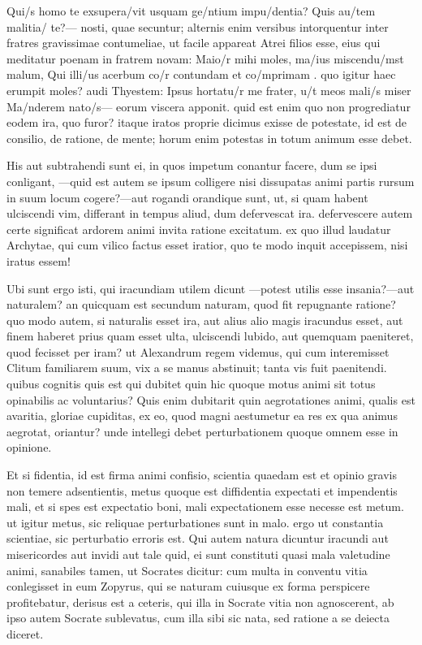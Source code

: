  Qui/s homo te exsupera/vit usquam ge/ntium impu/dentia? Quis au/tem malitia/ te?— nosti, quae secuntur; alternis enim versibus intorquentur inter fratres gravissimae contumeliae, ut facile appareat Atrei filios esse, eius qui meditatur poenam in fratrem novam: Maio/r mihi moles, ma/ius miscendu/mst malum, Qui illi/us acerbum co/r contundam et co/mprimam . quo igitur haec erumpit moles? audi Thyestem: Ipsus hortatu/r me frater, u/t meos mali/s miser Ma/nderem nato/s— eorum viscera apponit. quid est enim quo non progrediatur eodem ira, quo furor? itaque iratos proprie dicimus exisse de potestate, id est de consilio, de ratione, de mente; horum enim potestas in totum animum esse debet.

 His aut subtrahendi sunt ei, in quos impetum conantur facere, dum se ipsi conligant, —quid est autem se ipsum colligere nisi dissupatas animi partis rursum in suum locum cogere?—aut rogandi orandique sunt, ut, si quam habent ulciscendi vim, differant in tempus aliud, dum defervescat ira. defervescere autem certe significat ardorem animi invita ratione excitatum. ex quo illud laudatur Archytae, qui cum vilico factus esset iratior, quo te modo inquit accepissem, nisi iratus essem!

 Ubi sunt ergo isti, qui iracundiam utilem dicunt —potest utilis esse insania?—aut naturalem? an quicquam est secundum naturam, quod fit repugnante ratione? quo modo autem, si naturalis esset ira, aut alius alio magis iracundus esset, aut finem haberet prius quam esset ulta, ulciscendi lubido, aut quemquam paeniteret, quod fecisset per iram? ut Alexandrum regem videmus, qui cum interemisset Clitum familiarem suum, vix a se manus abstinuit; tanta vis fuit paenitendi. quibus cognitis quis est qui dubitet quin hic quoque motus animi sit totus opinabilis ac voluntarius? Quis enim dubitarit quin aegrotationes animi, qualis est avaritia, gloriae cupiditas, ex eo, quod magni aestumetur ea res ex qua animus aegrotat, oriantur? unde intellegi debet perturbationem quoque omnem esse in opinione.

 Et si fidentia, id est firma animi confisio, scientia quaedam est et opinio gravis non temere adsentientis, metus quoque est diffidentia expectati et impendentis mali, et si spes est expectatio boni, mali expectationem esse necesse est metum. ut igitur metus, sic reliquae perturbationes sunt in malo. ergo ut constantia scientiae, sic perturbatio erroris est. Qui autem natura dicuntur iracundi aut misericordes aut invidi aut tale quid, ei sunt constituti quasi mala valetudine animi, sanabiles tamen, ut Socrates dicitur: cum multa in conventu vitia conlegisset in eum Zopyrus, qui se naturam cuiusque ex forma perspicere profitebatur, derisus est a ceteris, qui illa in Socrate vitia non agnoscerent, ab ipso autem Socrate sublevatus, cum illa sibi sic nata, sed ratione a se deiecta diceret.

